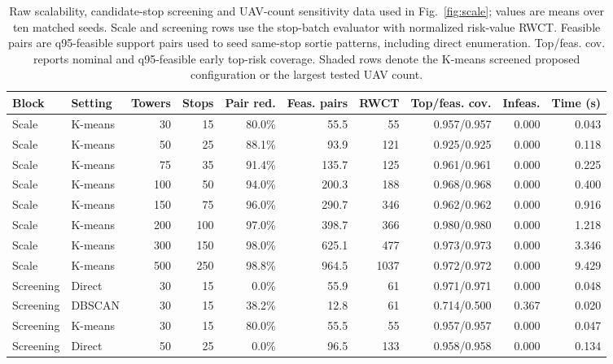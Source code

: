 \begin{table}[H]
\centering
\caption{Raw scalability, candidate-stop screening and UAV-count sensitivity data used in Fig.~\ref{fig:scale}; values are means over ten matched seeds. Scale and screening rows use the stop-batch evaluator with normalized risk-value RWCT. Feasible pairs are q95-feasible support pairs used to seed same-stop sortie patterns, including direct enumeration. Top/feas. cov. reports nominal and q95-feasible early top-risk coverage. Shaded rows denote the K-means screened proposed configuration or the largest tested UAV count.}
\label{tab:scalability-screening}
\small
\setlength{\tabcolsep}{2.7pt}
\begin{tabularx}{\textwidth}{@{}>{\raggedright\arraybackslash}p{}>{\raggedright\arraybackslash}Xrrrrrrrr@{}}
\toprule
Block & Setting & Towers & Stops & Pair red. & Feas. pairs & RWCT & Top/feas. cov. & Infeas. & Time (s) \\
\midrule
\rowcolor{gray!10}
Scale & K-means & 30 & 15 & 80.0\% & 55.5 & 55 & 0.957/0.957 & 0.000 & 0.043 \\
\rowcolor{gray!10}
Scale & K-means & 50 & 25 & 88.1\% & 93.9 & 121 & 0.925/0.925 & 0.000 & 0.118 \\
\rowcolor{gray!10}
Scale & K-means & 75 & 35 & 91.4\% & 135.7 & 125 & 0.961/0.961 & 0.000 & 0.225 \\
\rowcolor{gray!10}
Scale & K-means & 100 & 50 & 94.0\% & 200.3 & 188 & 0.968/0.968 & 0.000 & 0.400 \\
\rowcolor{gray!10}
Scale & K-means & 150 & 75 & 96.0\% & 290.7 & 346 & 0.962/0.962 & 0.000 & 0.916 \\
\rowcolor{gray!10}
Scale & K-means & 200 & 100 & 97.0\% & 398.7 & 366 & 0.980/0.980 & 0.000 & 1.218 \\
\rowcolor{gray!10}
Scale & K-means & 300 & 150 & 98.0\% & 625.1 & 477 & 0.973/0.973 & 0.000 & 3.346 \\
\rowcolor{gray!10}
Scale & K-means & 500 & 250 & 98.8\% & 964.5 & 1037 & 0.972/0.972 & 0.000 & 9.429 \\
\addlinespace[2pt]
Screening & Direct & 30 & 15 & 0.0\% & 55.9 & 61 & 0.971/0.971 & 0.000 & 0.048 \\
Screening & DBSCAN & 30 & 15 & 38.2\% & 12.8 & 61 & 0.714/0.500 & 0.367 & 0.020 \\
\rowcolor{gray!10}
Screening & K-means & 30 & 15 & 80.0\% & 55.5 & 55 & 0.957/0.957 & 0.000 & 0.047 \\
Screening & Direct & 50 & 25 & 0.0\% & 96.5 & 133 & 0.958/0.958 & 0.000 & 0.134 \\

\end{tabularx}
\end{table}
